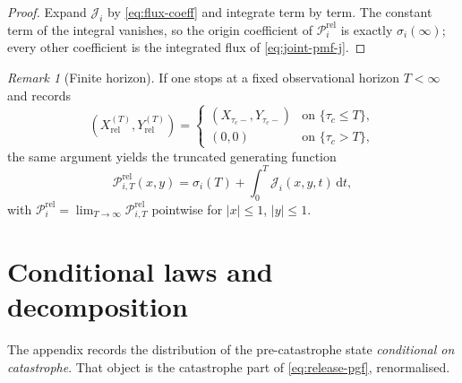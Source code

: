 \documentclass[11pt]{article}
\newcommand{\dd}{\mathrm d}
\newcommand{\Xrel}{X_{\mathrm{rel}}}
\newcommand{\Yrel}{Y_{\mathrm{rel}}}
\theoremstyle{plain}
\theoremstyle{definition}
\theoremstyle{remark}
\newtheorem{remark}{Remark}
\begin{document}
\begin{proof}
Expand $\mathcal J_i$ by \cref{eq:flux-coeff} and integrate term by term. The constant term of the
integral vanishes, so the origin coefficient of $\mathcal P_i^{\mathrm{rel}}$ is exactly
$\sigma_i(\infty)$; every other coefficient is the integrated flux of \cref{eq:joint-pmf-j}.
\end{proof}

\begin{remark}[Finite horizon]
If one stops at a fixed observational horizon $T<\infty$ and records
\begin{equation*}
(\Xrel^{(T)},\Yrel^{(T)})
=
\begin{cases}
(X_{\tau_c-},Y_{\tau_c-}) & \text{on }\{\tau_c\le T\},\\
(0,0) & \text{on }\{\tau_c>T\},
\end{cases}
\end{equation*}
the same argument yields the truncated generating function
\begin{equation}
\label{eq:release-pgf-T}
\mathcal P_{i,T}^{\mathrm{rel}}(x,y)
=
\sigma_i(T)
+
\int_0^T
\mathcal J_i(x,y,t)\,
\dd t,
\end{equation}
with $\mathcal P_i^{\mathrm{rel}}=\lim_{T\to\infty}\mathcal P_{i,T}^{\mathrm{rel}}$ pointwise for
$|x|\le 1$, $|y|\le 1$.
\end{remark}

\section{Conditional laws and decomposition}

The appendix records the distribution of the pre-catastrophe state \emph{conditional on
catastrophe}. That object is the catastrophe part of \cref{eq:release-pgf}, renormalised.
\end{document}
